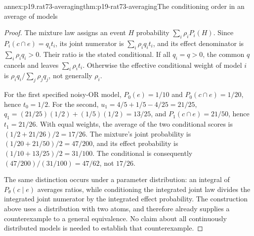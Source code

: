 \begin{annexitem}{annex:p19.rat73-averaging}{thm:p19-rat73-averaging}{The conditioning order in an average of models}
\begin{proof}
The mixture law assigns an event \(H\) probability
\(\sum_i\rho_iP_i(H)\). Since
\(P_i(c\cap e)=q_it_i\), its joint numerator is
\(\sum_i\rho_iq_it_i\), and its effect denominator is
\(\sum_i\rho_iq_i>0\). Their ratio is the stated conditional.
If all \(q_i=q>0\), the common \(q\) cancels and leaves
\(\sum_i\rho_it_i\). Otherwise the effective conditional weight
of model \(i\) is \(\rho_iq_i/\sum_j\rho_jq_j\), not
generally \(\rho_i\).

For the first specified noisy-OR model,
\(P_0(e)=1/10\) and \(P_0(c\cap e)=1/20\), hence
\(t_0=1/2\). For the second,
\(u_1=4/5+1/5-4/25=21/25\),
\(q_1=(21/25)(1/2)+(1/5)(1/2)=13/25\), and
\(P_1(c\cap e)=21/50\), hence \(t_1=21/26\).
With equal weights, the average of the two conditional scores is
\((1/2+21/26)/2=17/26\).
The mixture's joint probability is
\((1/20+21/50)/2=47/200\), and its effect probability is
\((1/10+13/25)/2=31/100\). The conditional is consequently
\((47/200)/(31/100)=47/62\), not \(17/26\).

The same distinction occurs under a parameter distribution: an integral
of \(P_\theta(c\mid e)\) averages ratios, while conditioning the
integrated joint law divides the integrated joint numerator by the
integrated effect probability. The construction above uses a distribution
with two atoms, and therefore already supplies a counterexample to a
general equivalence. No claim about all continuously distributed models
is needed to establish that counterexample.
\end{proof}
\end{annexitem}

